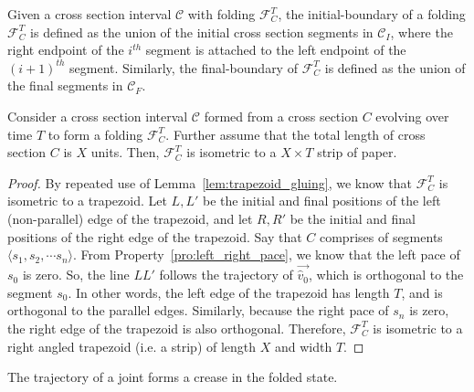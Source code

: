 \begin{definition}
\label{def:interval_folding_boundary}
Given a cross section interval $\mathcal C$ with folding $\mathcal F_C^T$,
the initial-boundary of a folding $\mathcal F_C^T$ is defined as the union of the initial cross section segments in $\mathcal C_I$,
where the right endpoint of the $i^{th}$ segment is attached to the left endpoint of the $(i+1)^{th}$ segment.
Similarly, the final-boundary of $\mathcal F_C^T$ is defined as the union of the final segments in $\mathcal C_F$.
\end{definition}

\begin{theorem}
\label{thm:interval_strip}
Consider a cross section interval $\mathcal C$ formed from a cross section $C$ evolving over time $T$ to form a folding $\mathcal F_C^T$.
Further assume that the total length of cross section $C$ is $X$ units. Then, $\mathcal F_C^T$ is isometric to a $X\times T$ strip of paper.
\end{theorem}
\begin{proof}
By repeated use of Lemma~\ref{lem:trapezoid_gluing}, we know that $\mathcal F_C^T$ is isometric to a trapezoid.
Let $L,L'$ be the initial and final positions of the left (non-parallel) edge of the trapezoid, and
let $R,R'$ be the initial and final positions of the right edge of the trapezoid.
Say that $C$ comprises of segments $ \langle s_1, s_2,\cdots s_n \rangle$.
From Property~\ref{pro:left_right_pace}, we know that the left pace of $s_0$ is zero.
So, the line $LL'$ follows the trajectory of $\vec{\hat v_0}$, which is orthogonal to the segment $s_0$.
In other words, the left edge of the trapezoid has length $T$, and is orthogonal to the parallel edges.
Similarly, because the right pace of $s_n$ is zero, the right edge of the trapezoid is also orthogonal.
Therefore, $\mathcal F_C^T$ is isometric to a right angled trapezoid (i.e. a strip) of length $X$ and width $T$.
\end{proof}

\begin{proposition}
\label{prop:joint_crease}
The trajectory of a joint forms a crease in the folded state.
\end{proposition}

